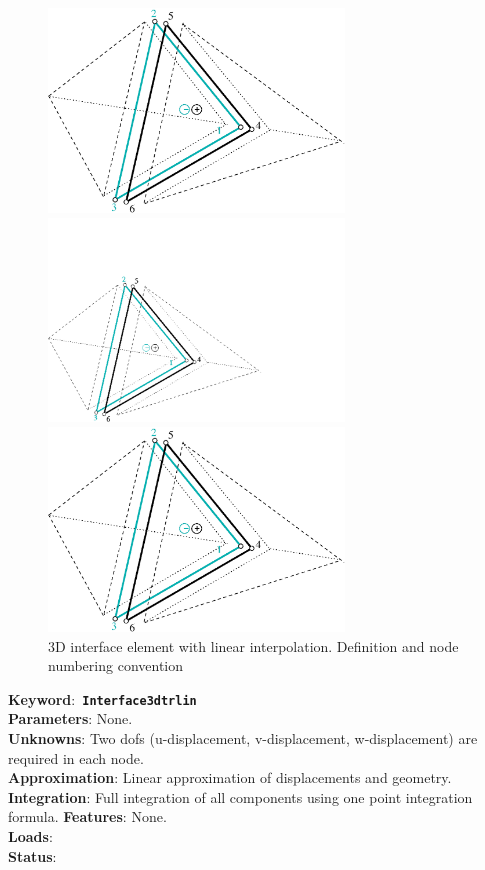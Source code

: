\documentclass[a4paper]{article}
\newcommand{\descitem}[1]{{\noindent \bf #1}:}
\newcommand{\elemkeyword}[1]{\descitem{Keyword}~{\bf \texttt{#1}}}
\begin{document}
\begin{figure}[tb]
\begin{htmlonly}
  \centerline{\includegraphics[width=0.7\textwidth]{interf3d_lin.eps}}
\end{htmlonly}
\ifpdf
 \centerline{\includegraphics[width=0.7\textwidth]{interf3d_lin.pdf}}
\else
 \centerline{\includegraphics[width=0.7\textwidth]{interf3d_lin.eps}}
\fi
\caption{3D interface element with linear interpolation. Definition and node numbering convention}
\label{interf3d_lin_fig}
\end{figure}

\elemkeyword{Interface3dtrlin}\\
\descitem{Parameters} None.\\
\descitem{Unknowns}
Two dofs (u-displacement, v-displacement, w-displacement) are required in each node.\\
\descitem{Approximation} Linear approximation of displacements and
geometry.\\
\descitem{Integration}
Full integration of all components using one point integration formula.
\descitem{Features} None.\\
\descitem{Loads} \\
\descitem{Status} 
\end{document}
